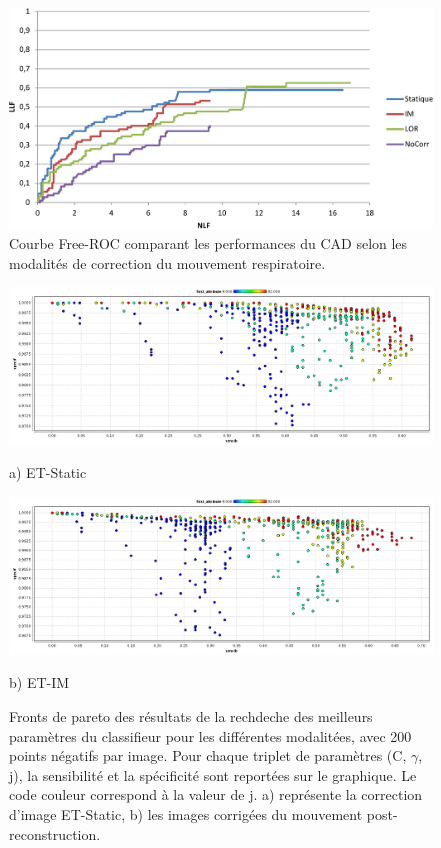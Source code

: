 \begin{figure}[h!]
 \begin{center}
   \includegraphics[width=15cm]{images/FROC_mod19}
 \end{center}
 \caption{ \label{lab:froc_mod19} Courbe Free-ROC comparant les performances du CAD selon les modalités de correction du mouvement respiratoire.}
\end{figure}


\begin{figure}[h!]

\begin{center}
 \includegraphics[width=14cm]{images/pareto_mod_Static19.png}

{\small a) ET-Static}
\vspace{0.5cm}

 \includegraphics[width=14cm]{images/pareto_mod_IM19.png}

{\small b) ET-IM}

\end{center}
 \caption{\label{fig:paretoModalite19_1} Fronts de pareto des résultats de la rechdeche des meilleurs paramètres du classifieur pour les différentes modalitées, avec 200 points négatifs par image. Pour chaque triplet de paramètres (C, $\gamma$, j), la sensibilité et la spécificité sont reportées sur le graphique. Le code couleur correspond à la valeur de j. a) représente la correction d'image ET-Static, b) les images corrigées du mouvement post-reconstruction.}
\end{figure}

